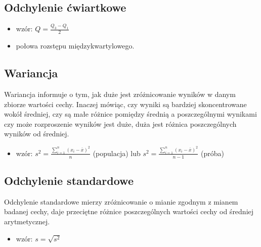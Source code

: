 \documentclass[
  polish,
  letterpaper,
  DIV=11,
  numbers=noendperiod]{scrreprt}
\providecommand{\tightlist}{%
  \setlength{\itemsep}{0pt}\setlength{\parskip}{0pt}}
\begin{document}
\subsection{Odchylenie ćwiartkowe}\label{odchylenie-ux107wiartkowe}

\begin{itemize}
\tightlist
\item
  wzór: \(Q=\frac{Q_3-Q_1}{2}\)
\item
  połowa rozstępu międzykwartylowego.
\end{itemize}

\subsection{Wariancja}\label{wariancja}

Wariancja informuje o tym, jak duże jest zróżnicowanie wyników w danym
zbiorze wartości cechy. Inaczej mówiąc, czy wyniki są bardziej
skoncentrowane wokół średniej, czy są małe różnice pomiędzy średnią a
poszczególnymi wynikami czy może rozproszenie wyników jest duże, duża
jest różnica poszczególnych wyników od średniej.

\begin{itemize}
\tightlist
\item
  wzór: \(s^2=\frac{\sum\limits_{i=1}^n (x_i-\overline{x})^2}{n}\)
  (populacja) lub
  \(s^2=\frac{\sum\limits_{i=1}^n (x_i-\overline{x})^2}{n-1}\) (próba)
\end{itemize}

\subsection{Odchylenie standardowe}\label{odchylenie-standardowe}

Odchylenie standardowe mierzy zróżnicowanie o mianie zgodnym z mianem
badanej cechy, daje przeciętne różnice poszczególnych wartości cechy od
średniej arytmetycznej.

\begin{itemize}
\tightlist
\item
  wzór: \(s=\sqrt{s^2}\)
\end{itemize}
\end{document}
